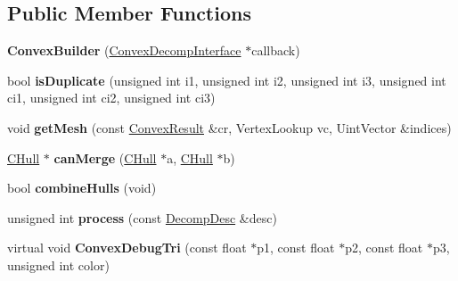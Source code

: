 \subsection*{Public Member Functions}
\begin{DoxyCompactItemize}
\item 
\hypertarget{class_convex_builder_a6f3cce36ddd0fa83dc8513e551ca954c}{{\bfseries Convex\-Builder} (\hyperlink{class_convex_decomposition_1_1_convex_decomp_interface}{Convex\-Decomp\-Interface} $\ast$callback)}\label{class_convex_builder_a6f3cce36ddd0fa83dc8513e551ca954c}

\item 
\hypertarget{class_convex_builder_a9203aa9ff35017024a611f48f3f3437b}{bool {\bfseries is\-Duplicate} (unsigned int i1, unsigned int i2, unsigned int i3, unsigned int ci1, unsigned int ci2, unsigned int ci3)}\label{class_convex_builder_a9203aa9ff35017024a611f48f3f3437b}

\item 
\hypertarget{class_convex_builder_ae2aada85346557d8780fcf35a0a13d0f}{void {\bfseries get\-Mesh} (const \hyperlink{class_convex_decomposition_1_1_convex_result}{Convex\-Result} \&cr, Vertex\-Lookup vc, Uint\-Vector \&indices)}\label{class_convex_builder_ae2aada85346557d8780fcf35a0a13d0f}

\item 
\hypertarget{class_convex_builder_afe09317380f052023cc33a44c8ad1afc}{\hyperlink{class_c_hull}{C\-Hull} $\ast$ {\bfseries can\-Merge} (\hyperlink{class_c_hull}{C\-Hull} $\ast$a, \hyperlink{class_c_hull}{C\-Hull} $\ast$b)}\label{class_convex_builder_afe09317380f052023cc33a44c8ad1afc}

\item 
\hypertarget{class_convex_builder_aa3310983f122da014be579a2c90507bc}{bool {\bfseries combine\-Hulls} (void)}\label{class_convex_builder_aa3310983f122da014be579a2c90507bc}

\item 
\hypertarget{class_convex_builder_aa60b2d47867847a1df4d1c8adf9e4dc1}{unsigned int {\bfseries process} (const \hyperlink{class_convex_decomposition_1_1_decomp_desc}{Decomp\-Desc} \&desc)}\label{class_convex_builder_aa60b2d47867847a1df4d1c8adf9e4dc1}

\item 
\hypertarget{class_convex_builder_a0d4761811c1aba03501f99c7fd3ac60b}{virtual void {\bfseries Convex\-Debug\-Tri} (const float $\ast$p1, const float $\ast$p2, const float $\ast$p3, unsigned int color)}\label{class_convex_builder_a0d4761811c1aba03501f99c7fd3ac60b}


\end{DoxyCompactItemize}
